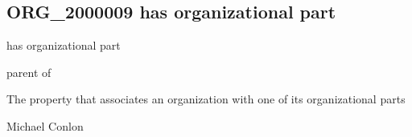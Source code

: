 \documentclass[letterpaper,10pt,english]{sphinxmanual}
\begin{document}
\subsection{ORG\_2000009 \sphinxhyphen{} has organizational part}
\label{\detokenize{doc-ORG_2000009:org-2000009-has-organizational-part}}\label{\detokenize{doc-ORG_2000009:index-0}}\label{\detokenize{doc-ORG_2000009::doc}}
\begin{sphinxShadowBox}

\sphinxAtStartPar
has organizational part
\end{sphinxShadowBox}

\begin{sphinxShadowBox}

\sphinxAtStartPar
parent of
\end{sphinxShadowBox}

\begin{sphinxShadowBox}

\sphinxAtStartPar
{}
\end{sphinxShadowBox}

\begin{sphinxShadowBox}

\sphinxAtStartPar
The property that associates an organization with one of its organizational parts
\end{sphinxShadowBox}

\begin{sphinxShadowBox}

\sphinxAtStartPar
Michael Conlon 
\end{sphinxShadowBox}

\begin{sphinxShadowBox}

\sphinxAtStartPar
{\hyperref[\detokenize{doc-ORG_0000001::doc}]{}}
\end{sphinxShadowBox}

\begin{sphinxShadowBox}

\sphinxAtStartPar
{\hyperref[\detokenize{doc-ORG_0000005::doc}]{}}
\end{sphinxShadowBox}
\end{document}
